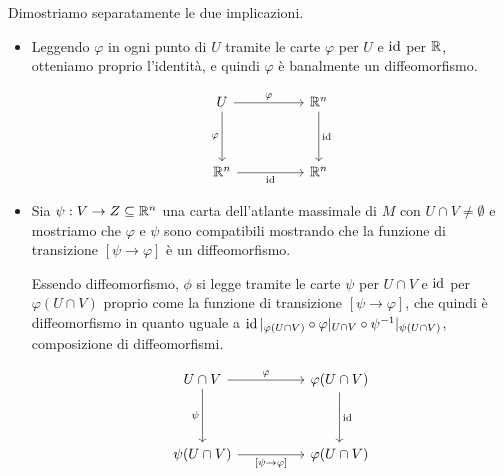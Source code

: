 \documentclass[letterpaper, 11pt]{extarticle}
\begin{document}
\begin{solution}
    Dimostriamo separatamente le due implicazioni.

    \begin{itemize}
        \item[$\boxed{\implies}$] Leggendo $\varphi$ in ogni punto di $U$ tramite le carte $\varphi$ per $U$ e $\operatorname{id}$ per $\mathbb{R}$, otteniamo proprio l'identità, e quindi $\varphi$
              è banalmente un diffeomorfismo.

              \[\begin{tikzcd}
                      U && {\RR^n} \\
                      \\
                      {\RR^n} && {\RR^n}
                      \arrow["\varphi", from=1-1, to=1-3]
                      \arrow["\varphi"', from=1-1, to=3-1]
                      \arrow["\id", from=1-3, to=3-3]
                      \arrow["\id"', from=3-1, to=3-3]
                  \end{tikzcd}\]

        \item[$\boxed{\impliedby}$] Sia $\psi : V \to Z \subseteq \mathbb{R}^n$ una carta dell'atlante massimale di $M$ con $U \cap V \neq \emptyset$ e mostriamo che $\varphi$
              e $\psi$ sono compatibili mostrando che la funzione di transizione $[\psi \to \varphi]$ è un diffeomorfismo. \smallskip

              Essendo diffeomorfismo, $\phi$ si legge tramite le carte $\psi$ per $U \cap V$ e $\operatorname{id}$ per $\varphi(U \cap V)$ proprio come la funzione
              di transizione $[\psi \to \varphi]$, che quindi è diffeomorfismo in quanto uguale a
              $\operatorname{id}\arrowvert_{\varphi(U \cap V)} \circ \varphi\arrowvert_{U \cap V} \circ \psi^{-1}\arrowvert_{\psi(U \cap V)}$, composizione di diffeomorfismi.

              \[\begin{tikzcd}
                      {U \cap V} && {\varphi(U \cap V)} \\
                      \\
                      {\psi(U \cap V)} && {\varphi(U \cap V)}
                      \arrow["\varphi", from=1-1, to=1-3]
                      \arrow["\psi"', from=1-1, to=3-1]
                      \arrow["\id", from=1-3, to=3-3]
                      \arrow["{[\psi \to \varphi]}"', from=3-1, to=3-3]
                  \end{tikzcd}\]
    \end{itemize}
\end{solution}
\end{document}
